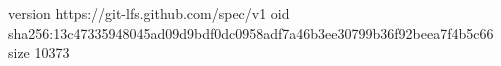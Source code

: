 version https://git-lfs.github.com/spec/v1
oid sha256:13c47335948045ad09d9bdf0dc0958adf7a46b3ee30799b36f92beea7f4b5c66
size 10373
